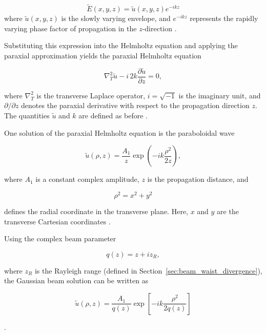 \begin{equation}
\tilde{E}(x,y,z)=\tilde{u}(x,y,z)e^{-ikz}
\end{equation}
where \(\tilde{u}(x,y,z)\) is the slowly varying envelope, and \(e^{-ikz}\) represents the rapidly varying phase factor of propagation in the \(z\)-direction .



Substituting this expression into the Helmholtz equation and applying the paraxial approximation yields the paraxial Helmholtz equation

\begin{equation}
\nabla_T^2 \tilde{u}
- i\,2k \frac{\partial \tilde{u}}{\partial z}
=0,
\end{equation}

where \(\nabla_T^2\) is the transverse Laplace operator, \(i=\sqrt{-1}\) is the imaginary unit, and \(\partial/\partial z\) denotes the paraxial derivative with respect to the propagation direction \(z\). The quantities \(\tilde{u}\) and \(k\) are defined as before .

One solution of the paraxial Helmholtz equation is the paraboloidal wave

\begin{equation}
\tilde{u}(\rho,z)=\frac{A_1}{z}
\exp\left(-ik\frac{\rho^2}{2z}\right),
\end{equation}

where \(A_1\) is a constant complex amplitude, \(z\) is the propagation distance, and

\begin{equation}
\rho^2=x^2+y^2
\end{equation}

defines the radial coordinate in the transverse plane. Here, \(x\) and \(y\) are the transverse Cartesian coordinates .

Using the complex beam parameter

\begin{equation}
q(z)=z+iz_R,
\end{equation}

where \(z_R\) is the Rayleigh range (defined in Section~\ref{sec:beam_waist_divergence}), the Gaussian beam solution can be written as

\begin{equation}
\tilde{u}(\rho,z)=\frac{A_1}{q(z)}
\exp\left[-ik\frac{\rho^2}{2q(z)}\right]
\end{equation}

.

